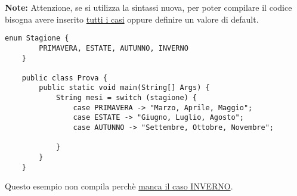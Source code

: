 \documentclass[../main.tex]{subfiles}
\begin{document}
\vspace{0.75cm}
\textbf{Note:} Attenzione, se si utilizza la sintassi nuova, per poter compilare il codice bisogna avere inserito \underline{tutti i casi}
oppure definire un valore di default.
\begin{lstlisting}[style=java]
    enum Stagione {
        PRIMAVERA, ESTATE, AUTUNNO, INVERNO
    }

    public class Prova {
        public static void main(String[] Args) {
            String mesi = switch (stagione) {
                case PRIMAVERA -> "Marzo, Aprile, Maggio";
                case ESTATE -> "Giugno, Luglio, Agosto";
                case AUTUNNO -> "Settembre, Ottobre, Novembre";

            }
        }
    }
\end{lstlisting}
Questo esempio non compila perchè \underline{manca il caso INVERNO}.
\end{document}
